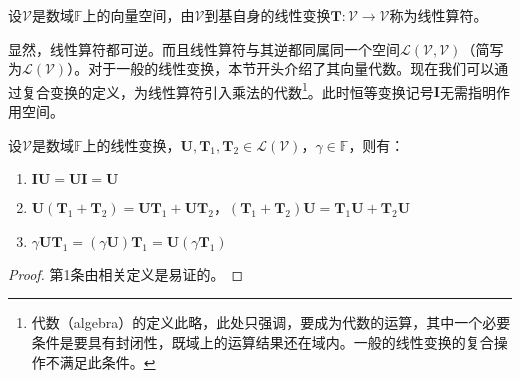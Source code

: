 \documentclass[main.tex]{subfiles}
\begin{document}
\begin{definition}[线性算符]\label{def:II.4.5}
设$\mathcal{V}$是数域$\mathbb{F}$上的向量空间，由$\mathcal{V}$到基自身的线性变换$\mathbf{T}:\mathcal{V}\rightarrow\mathcal{V}$称为线性算符。
\end{definition}

显然，线性算符都可逆。而且线性算符与其逆都同属同一个空间$\mathcal{L}\left(\mathcal{V},\mathcal{V}\right)$（简写为$\mathcal{L}\left(\mathcal{V}\right)$）。对于一般的线性变换，本节开头介绍了其向量代数。现在我们可以通过复合变换的定义，为线性算符引入乘法的代数\footnote{代数（algebra）的定义此略，此处只强调，要成为代数的运算，其中一个必要条件是要具有封闭性，既域上的运算结果还在域内。一般的线性变换的复合操作不满足此条件。}。此时恒等变换记号$\mathbf{I}$无需指明作用空间。

\begin{theorem}\label{thm:II.4.12}
设$\mathcal{V}$是数域$\mathbb{F}$上的线性变换，$\mathbf{U},\mathbf{T}_1,\mathbf{T}_2\in\mathcal{L}\left(\mathcal{V}\right)$，$\gamma\in\mathbb{F}$，则有：
\begin{enumerate}
    \item $\mathbf{IU}=\mathbf{UI}=\mathbf{U}$
    \item $\mathbf{U}\left(\mathbf{T}_1+\mathbf{T}_2\right)=\mathbf{UT}_1+\mathbf{UT}_2$，$\left(\mathbf{T}_1+\mathbf{T}_2\right)\mathbf{U}=\mathbf{T}_1\mathbf{U}+\mathbf{T}_2\mathbf{U}$
    \item $\gamma\mathbf{UT}_1=\left(\gamma\mathbf{U}\right)\mathbf{T}_1=\mathbf{U}\left(\gamma\mathbf{T}_1\right)$
\end{enumerate}
\begin{proof}
第1条由相关定义是易证的。


\end{proof}
\end{theorem}
\end{document}
